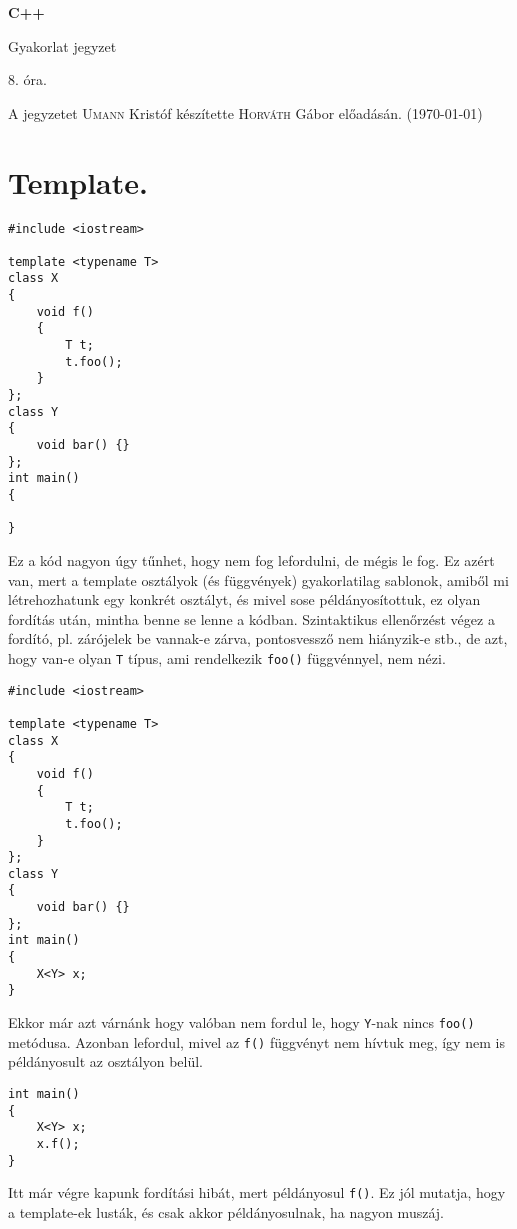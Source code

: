 \documentclass[a4paper,11.5pt]{article}
\begin{document}
	\setlength\parindent{0pt}
	\def\s{\hspace{0.2mm}\vphantom{\beta}}
	\def\Z{\mathbb{Z}}
	\def\Q{\mathbb{Q}}
	\def\R{\mathbb{R}}
	\def\C{\mathbb{C}}
	\def\N{\mathbb{N}}
	\def\Ra{\overline{\mathbb{R}}}
	
	\def\sume{\displaystyle\sum_{n=1}^{+\infty}}
	\def\sumn{\displaystyle\sum_{n=0}^{+\infty}}
	
	\def\narrow{\underset{n\rightarrow+\infty}{\longrightarrow}}
	\def\limn{\displaystyle\lim_{n\to +\infty}}
	\def\limx{\displaystyle\lim_{x\to +\infty}}
	
	\theoremstyle{definition}
	\newtheorem{theorem}{Tétel}[subsection] 
	
	\theoremstyle{definition}
	\newtheorem{definition}[theorem]{Definíció} 
	\newtheorem{example}[theorem]{Példa} 
	\newtheorem{task}[theorem]{Feladat} 
	\newtheorem{note}[theorem]{Megjegyzés}
	\begin{center}
		{\LARGE\textbf{C++}}
		
		{\Large Gyakorlat jegyzet}
		
		8. óra.
	\end{center}
	A jegyzetet \textsc{Umann} Kristóf készítette \textsc{Horváth} Gábor  előadásán. (\today)
	\section{Template.}
	\begin{lstlisting}
#include <iostream>

template <typename T>
class X
{
	void f()
	{
		T t;
		t.foo();
	}
};
class Y
{
	void bar() {}
};
int main()
{
	
}
	\end{lstlisting}
	Ez a kód nagyon úgy tűnhet, hogy nem fog lefordulni, de mégis le fog. Ez azért van, mert a template osztályok (és függvények) gyakorlatilag sablonok, amiből mi létrehozhatunk egy konkrét osztályt, és mivel sose példányosítottuk, ez olyan fordítás után, mintha benne se lenne a kódban. Szintaktikus ellenőrzést végez a fordító, pl. zárójelek be vannak-e zárva, pontosvessző nem hiányzik-e stb., de azt, hogy van-e olyan \texttt{T} típus, ami rendelkezik \texttt{foo()} függvénnyel, nem nézi.
\begin{lstlisting}
#include <iostream>

template <typename T>
class X
{
	void f()
	{
		T t;
		t.foo();
	}
};
class Y
{
	void bar() {}
};
int main()
{
	X<Y> x;
}
\end{lstlisting}
	Ekkor már azt várnánk hogy valóban nem fordul le, hogy \texttt{Y}-nak nincs \texttt{foo()} metódusa. Azonban lefordul, mivel az \texttt{f()} függvényt nem hívtuk meg, így nem is példányosult az osztályon belül.
	\begin{lstlisting}
int main()
{
	X<Y> x;
	x.f();
}
	\end{lstlisting}
	Itt már végre kapunk fordítási hibát, mert példányosul \texttt{f()}. Ez jól mutatja, hogy a template-ek lusták, és csak akkor példányosulnak, ha nagyon muszáj.
	\medskip
	
\end{document}
